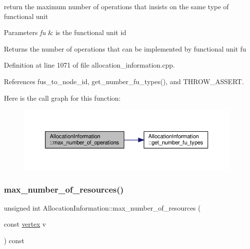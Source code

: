 return the maximum number of operations that insists on the same type of functional unit 


\begin{DoxyParams}{Parameters}
{\em fu} & is the functional unit id \\
\hline
\end{DoxyParams}
\begin{DoxyReturn}{Returns}
the number of operations that can be implemented by functional unit fu 
\end{DoxyReturn}


Definition at line 1071 of file allocation\+\_\+information.\+cpp.



References fus\+\_\+to\+\_\+node\+\_\+id, get\+\_\+number\+\_\+fu\+\_\+types(), and T\+H\+R\+O\+W\+\_\+\+A\+S\+S\+E\+RT.

Here is the call graph for this function\+:
\nopagebreak
\begin{figure}[H]
\begin{center}
\leavevmode
\includegraphics[width=350pt]{d7/d79/classAllocationInformation_a5e95ad970c76cfd32541915146d79002_cgraph}
\end{center}
\end{figure}
\mbox{\label{classAllocationInformation_a2e8890d648962f9ae7138611f05edb28}} 
\subsubsection{\texorpdfstring{max\+\_\+number\+\_\+of\+\_\+resources()}{max\_number\_of\_resources()}}
{\footnotesize\ttfamily unsigned int Allocation\+Information\+::max\+\_\+number\+\_\+of\+\_\+resources (\begin{DoxyParamCaption}\item[{const \hyperlink{graph_8hpp_abefdcf0544e601805af44eca032cca14}{vertex}}]{v }\end{DoxyParamCaption}) const}



